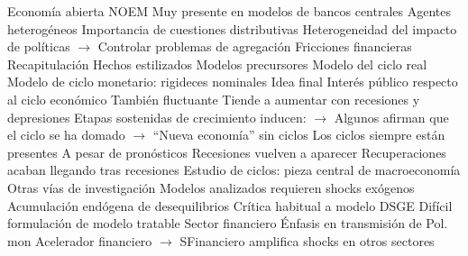 \documentclass{nuevotema}
\begin{document}
\begin{esquemal}
				\4 Economía abierta
				\4[] NOEM
				\4[] Muy presente en modelos de bancos centrales
				\4 Agentes heterogéneos
				\4[] Importancia de cuestiones distributivas
				\4[] Heterogeneidad del impacto de políticas
				\4[] $\to$ Controlar problemas de agregación
				\4 Fricciones financieras
	\1[] 
		\2 Recapitulación
			\3 Hechos estilizados
			\3 Modelos precursores
			\3 Modelo del ciclo real
			\3 Modelo de ciclo monetario: rigideces nominales
		\2 Idea final
			\3 Interés público respecto al ciclo económico
				\4 También fluctuante
				\4 Tiende a aumentar con recesiones y depresiones
				\4 Etapas sostenidas de crecimiento inducen:
				\4[] $\to$ Algunos afirman que el ciclo se ha domado
				\4[] $\to$ ``Nueva economía'' sin ciclos
			\3 Los ciclos siempre están presentes
				\4 A pesar de pronósticos
				\4[] Recesiones vuelven a aparecer
				\4[] Recuperaciones acaban llegando tras recesiones
				\4[$\Rightarrow$] Estudio de ciclos: pieza central de macroeconomía
			\3 Otras vías de investigación
				\4 Modelos analizados requieren shocks exógenos
				\4 Acumulación endógena de desequilibrios
				\4[] Crítica habitual a modelo DSGE
				\4[] Difícil formulación de modelo tratable
				\4 Sector financiero
				\4[] Énfasis en transmisión de Pol. mon
				\4[] Acelerador financiero
				\4[] $\to$ SFinanciero amplifica shocks en otros sectores
\end{esquemal}


























\graficas
\end{document}
